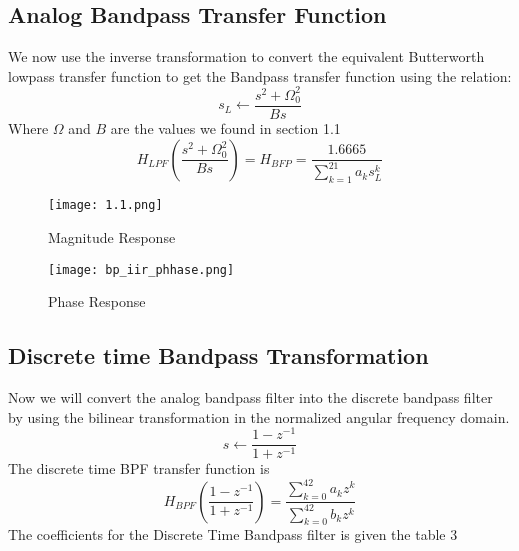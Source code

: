 \documentclass[12pt]{article}
\begin{document}
\subsection{\textbf{Analog Bandpass Transfer Function}}
We now use the inverse transformation to convert the equivalent Butterworth
lowpass transfer function to get the Bandpass transfer function using the
relation:
\begin{equation*}
    s_L \longleftarrow \frac{s^2+\Omega^2_0}{Bs}
\end{equation*}
Where $\Omega$ and $B$ are the values we found in section 1.1\\
\begin{equation*}
    H_{LPF}(\frac{s^2+\Omega_0^2}{Bs}) = H_{BFP} = \frac{1.6665}{\sum_{k=1}^{21}a_ks_L^k}
\end{equation*}

\begin{figure}[H]
\centering
\texttt{[image: 1.1.png]}
\caption{Magnitude Response}
\label{fig:mesh2}
\end{figure}
\begin{figure}[H]
\centering
\texttt{[image: bp\_iir\_phhase.png]}
\caption{Phase Response}
\label{fig:mesh2}
\end{figure}
\subsection{\textbf{Discrete time Bandpass Transformation}}
Now we will convert the analog bandpass filter into the discrete bandpass filter by using the bilinear transformation in the normalized angular frequency domain.
\begin{equation*}
    s \longleftarrow \frac{1-z^{-1}}{1+z^{-1}}
\end{equation*}
The discrete time BPF transfer function is
\begin{equation*}
    H_{BPF}\left (\frac{1-z^{-1}}{1+z^{-1}}\right) = \frac{\sum_{k=0}^{42}a_kz^k}{\sum_{k=0}^{42}b_kz^k}
\end{equation*}
The coefficients for the Discrete Time Bandpass filter is given the table 3
\end{document}
